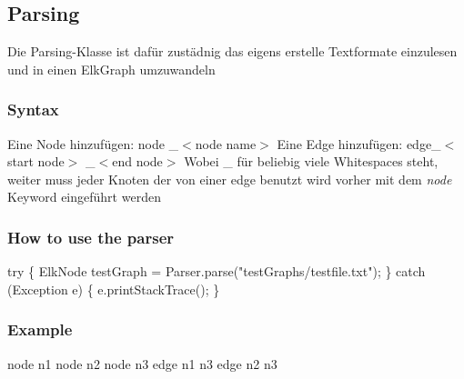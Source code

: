 

\newcommand\tab[1][1cm]{\hspace*{#1}}


\subsection*{Parsing}
Die Parsing-Klasse ist dafür zustädnig das eigens erstelle Textformate einzulesen
und in einen ElkGraph umzuwandeln

\subsubsection*{Syntax}
Eine Node hinzufügen:
\newline
\tab[0.5cm]  node \_$<$node name$>$
\newline
\newline
Eine Edge hinzufügen:\newline
\tab[0.5cm]  edge\_$<$start node$>$ \_$<$end node$>$
\newline
Wobei \_ für beliebig viele Whitespaces steht,
weiter muss jeder Knoten der von einer edge benutzt wird vorher mit dem \textit{node} Keyword eingeführt werden

\subsubsection*{How to use the parser}
try 
\{\newline
ElkNode testGraph = Parser.parse("testGraphs/testfile.txt");
\newline
\}
\newline
catch (Exception e)
\newline
\{
\newline
  e.printStackTrace(); 
\newline
\}


\subsubsection*{Example}
node n1 \newline
node n2 \newline
node n3 \newline
\newline
\newline
edge n1 n3\newline 
edge n2 n3 \newline









